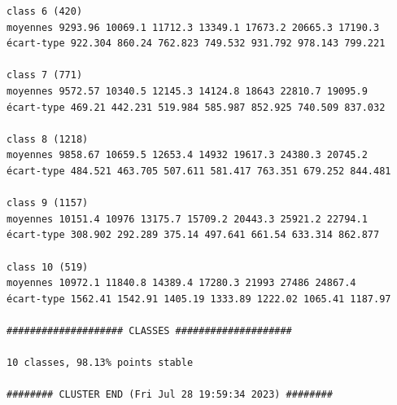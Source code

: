 \documentclass[land,article,submit,pdftex,moreauthors]{Definitions/mdpi}
\begin{document}
\begin{scriptsize}
\begin{verbatim}
class 6 (420)
moyennes 9293.96 10069.1 11712.3 13349.1 17673.2 20665.3 17190.3
écart-type 922.304 860.24 762.823 749.532 931.792 978.143 799.221

class 7 (771)
moyennes 9572.57 10340.5 12145.3 14124.8 18643 22810.7 19095.9
écart-type 469.21 442.231 519.984 585.987 852.925 740.509 837.032

class 8 (1218)
moyennes 9858.67 10659.5 12653.4 14932 19617.3 24380.3 20745.2
écart-type 484.521 463.705 507.611 581.417 763.351 679.252 844.481

class 9 (1157)
moyennes 10151.4 10976 13175.7 15709.2 20443.3 25921.2 22794.1
écart-type 308.902 292.289 375.14 497.641 661.54 633.314 862.877

class 10 (519)
moyennes 10972.1 11840.8 14389.4 17280.3 21993 27486 24867.4
écart-type 1562.41 1542.91 1405.19 1333.89 1222.02 1065.41 1187.97

#################### CLASSES ####################

10 classes, 98.13% points stable

######## CLUSTER END (Fri Jul 28 19:59:34 2023) ########

\end{verbatim}
\end{scriptsize}
\end{document}

